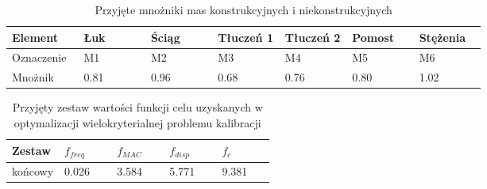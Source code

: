 \begin{table}[hbt!]
	\caption{Przyjęte mnożniki mas konstrukcyjnych i niekonstrukcyjnych}
	\label{tab:calibration_mass_prov}
	\footnotesize
	\setlength\tabcolsep{0pt}
	\begin{tabular}{@{}p{0.15\linewidth} *6{P{0.1417\linewidth}}@{}}
		\toprule
		Element    & Łuk & Ściąg & Tłuczeń 1 & Tłuczeń 2 & Pomost & Stężenia \\ \midrule 
		Oznaczenie & M1  & M2    & M3        & M4        & M5     & M6       \\ \midrule
		Mnożnik   & 0.81 & 0.96   & 0.68       & 0.76       & 0.80    & 1.02       \\ \bottomrule
	\end{tabular}
\end{table}


\begin{table}[hbt!]
	\caption{Przyjęty zestaw wartości funkcji celu uzyskanych w optymalizacji wielokryterialnej problemu kalibracji}
	\centering
	\footnotesize
	\setlength\tabcolsep{0pt}
	\begin{tabular}{@{}P{0.2\linewidth} *4{P{0.2\linewidth}}@{}}	
		\toprule
		Zestaw & $f_{freq}$ & $f_{MAC}$ & $f_{disp}$ & $f_{c}$ \\ \midrule
		końcowy & 0.026			& 3.584		  & 5.771		   & 9.381		\\ \bottomrule
	\end{tabular}
	\label{tab:minimal_values_calibration_prov}
\end{table}

